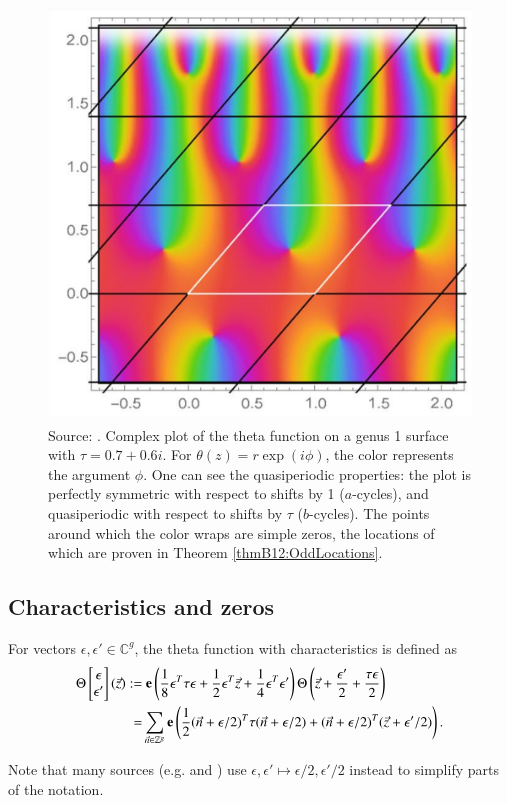 \begin{figure}
    \center
    \includegraphics{assets/genus1theta.png}
    \caption{Source: \cite{Cha22}.
    Complex plot of the theta function on a genus 1 surface with $\tau = 0.7+0.6i$. For $\theta(z)=r\exp(i\phi)$, the color represents the argument $\phi$. One can see the quasiperiodic properties: the plot is perfectly symmetric with respect to shifts by 1 ($a$-cycles), and quasiperiodic with respect to shifts by $\tau$ ($b$-cycles). The points around which the color wraps are simple zeros, the locations of which are proven in Theorem \ref{thmB12:OddLocations}.}
    \label{figB12:Genus1theta}
\end{figure}

\subsection{Characteristics and zeros}
\begin{definition}
    For vectors $\epsilon,\epsilon' \in \mathbb C^g$, the theta function with characteristics is defined as
    \begin{align}
        \Theta\begin{bmatrix} \epsilon \\  \epsilon'\end{bmatrix}(\vec z) :=& \ 
        \bolde\left(\frac{1}{8}\epsilon^T \tau \epsilon + \frac{1}{2}\epsilon^T \vec z + \frac{1}{4}\epsilon^T  \epsilon'\right)
        \Theta\left(\vec z + \frac{\epsilon'}{2}+\frac{\tau\epsilon}{2}\right)
       \\ =& \sum_{\vec n \in \mathbb Z^g} \bolde\left(\frac{1}{2} (\vec n+\epsilon/2)^T \tau (\vec n+\epsilon/2) + (\vec n+\epsilon/2)^T (\vec z+\epsilon'/2)\right).
    \end{align}

    Note that many sources (e.g. \cite{Cha22} and \cite{ComputationalSchottky}) use $\epsilon,\epsilon' \mapsto \epsilon/2,\epsilon'/2$ instead to simplify parts of the notation.
\end{definition}

